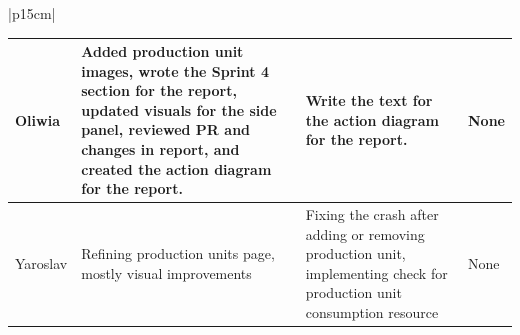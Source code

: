 \begin{table}[H]
    \centering
    \begin{tabular}{|p{15cm}|} 
        \hline
        \begin{table}[H]
            \begin{tabular}{|p{1.75cm}|p{4cm}|p{4cm}|p{4cm}|}
                \hline
                \cellcolor[HTML]{d4d4d4} Oliwia & Added production unit images, wrote the Sprint 4 section for the report, updated visuals for the side panel, reviewed PR and changes in report, and created the action diagram for the report. & Write the text for the action diagram for the report.  & None \\
                \hline
                \cellcolor[HTML]{d4d4d4} Yaroslav & Refining production units page, mostly visual improvements & Fixing the crash after adding or removing production unit, implementing check for production unit consumption resource & None \\
                \hline
            \end{tabular}
        \end{table}
        \\
        \hline
    \end{tabular}
\end{table}

